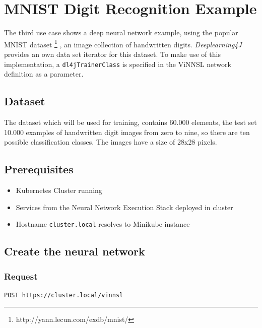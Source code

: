\section{MNIST Digit Recognition
Example}\label{mnist-digit-recognition-example}

The third use case shows a deep neural network example, using the
popular MNIST dataset \footnote{http://yann.lecun.com/exdb/mnist/}
\cite{lecun-mnisthandwrittendigit-2010}, an image collection of
handwritten digits. \emph{Deeplearning4J} provides an own data set
iterator for this dataset. To make use of this implementation, a
\texttt{dl4jTrainerClass} is specified in the ViNNSL network definition
as a parameter.

\subsection{Dataset}\label{dataset-2}

The dataset which will be used for training, contains 60.000 elements,
the test set 10.000 examples of handwritten digit images from zero to
nine, so there are ten possible classification classes. The images have
a size of 28x28 pixels.

\subsection{Prerequisites}\label{prerequisites-6}

\begin{itemize}
\tightlist
\item
  Kubernetes Cluster running
\item
  Services from the Neural Network Execution Stack deployed in cluster
\item
  Hostname \texttt{cluster.local} resolves to Minikube instance
\end{itemize}

\subsection{Create the neural
network}\label{create-the-neural-network-2}

\subsubsection{Request}\label{request-6}

\begin{verbatim}
POST https://cluster.local/vinnsl
\end{verbatim}

